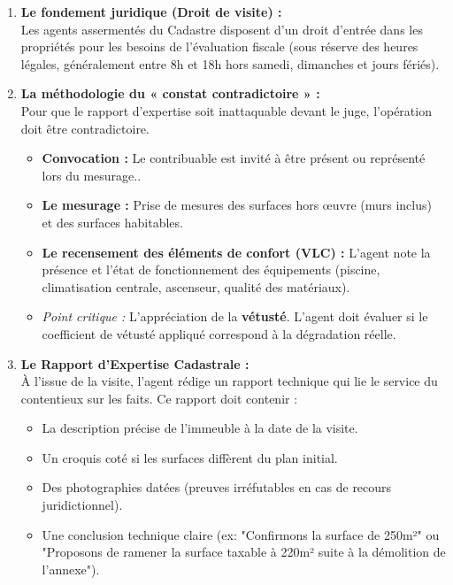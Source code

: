 \documentclass[Cours_contentieuxTF2026.tex]{subfiles}
\begin{document}
\begin{enumerate}
	\item \textbf{Le fondement juridique (Droit de visite) :} \\
	Les agents assermentés du Cadastre disposent d'un droit d'entrée dans les propriétés pour les besoins de l'évaluation fiscale (sous réserve des heures légales, généralement entre 8h et 18h hors samedi, dimanches et jours fériés).
	
	\item \textbf{La méthodologie du « constat contradictoire » :} \\
	Pour que le rapport d'expertise soit inattaquable devant le juge, l'opération doit être contradictoire.
	\begin{itemize}
		\item \textbf{Convocation :} Le contribuable est invité à être présent ou représenté lors du mesurage..
		\item \textbf{Le mesurage :} Prise de mesures des surfaces hors œuvre (murs inclus) et des surfaces habitables.
		\item \textbf{Le recensement des éléments de confort (VLC) :} L'agent note la présence et l'état de fonctionnement des équipements (piscine, climatisation centrale, ascenseur, qualité des matériaux).
		\item \textit{Point critique :} L'appréciation de la \textbf{vétusté}. L'agent doit évaluer si le coefficient de vétusté appliqué correspond à la dégradation réelle.
	\end{itemize}
	
	\item \textbf{Le Rapport d'Expertise Cadastrale :} \\
	À l'issue de la visite, l'agent rédige un rapport technique qui lie le service du contentieux sur les faits. Ce rapport doit contenir :
	
	\begin{itemize}
		\item La description précise de l'immeuble à la date de la visite.
		
		\item Un croquis coté si les surfaces diffèrent du plan initial.
		
		\item Des photographies datées (preuves irréfutables en cas de recours juridictionnel).
		
		\item Une conclusion technique claire (ex: "Confirmons la surface de 250m²" ou "Proposons de ramener la surface taxable à 220m² suite à la démolition de l'annexe").
	\end{itemize}

\end{enumerate}
\end{document}
